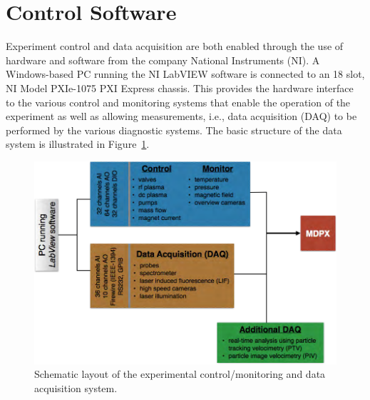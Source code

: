 
\section{Control Software}\label{section-control-system}

Experiment control and data acquisition are both enabled through the use of hardware and software from the company National Instruments (NI). A Windows-based PC running the NI LabVIEW software is connected to an 18 slot, NI Model PXIe-1075 PXI Express chassis. This provides the hardware interface to the various control and monitoring systems that enable the operation of the experiment as well as allowing measurements, i.e., data acquisition (DAQ) to be performed by the various diagnostic systems. The basic structure of the data system is illustrated in Figure~\ref{mdpx-software-structure}.

\begin{figure}[h]
\begin{center}
\includegraphics[width=6in]{figures/mdpx_software_structure.png}
\caption{Schematic layout of the experimental control/monitoring and data acquisition system. \label{mdpx-software-structure}}
\end{center}
\end{figure}

